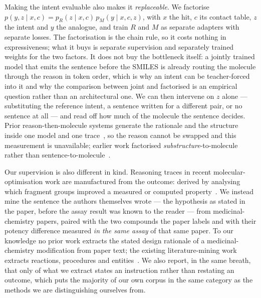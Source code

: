 Making the intent evaluable also makes it \emph{replaceable}. We factorise
$p(y,z\mid x,c)=p_R(z\mid x,c)\,p_M(y\mid x,c,z)$, with $x$ the hit, $c$ its contact table, $z$ the
intent and $y$ the analogue, and train $R$ and $M$ as separate adapters with separate losses. The
factorisation is the chain rule, so it costs nothing in expressiveness; what it buys is separate
supervision and separately trained weights for the two factors. It does not buy the bottleneck
itself: a jointly trained model that emits the sentence before the SMILES is already routing the
molecule through the reason in token order, which is why an intent can be teacher-forced into it and
why the comparison between joint and factorised is an empirical question rather than an
architectural one. We
can then intervene on $z$ alone --- substituting the reference intent, a sentence written for
a different pair, or no sentence at all --- and read off how much of the molecule the sentence
decides. Prior reason-then-molecule systems generate the rationale and the structure inside one
model and one trace~\citep{liu2026desron,liu2026drugr,wen2026logos}, so the reason cannot be swapped
and this measurement is unavailable; earlier work factorised \emph{substructure}-to-molecule rather
than sentence-to-molecule~\citep{jin2020rationale}.

Our supervision is also different in kind. Reasoning traces in recent molecular-optimisation work
are manufactured from the outcome: derived by analysing which fragment groups improved a measured
or computed property~\citep{liu2026desro,liu2026drugr}. We instead mine the sentence the authors
themselves wrote --- the hypothesis as stated in the paper, before the assay result was known to the
reader --- from  medicinal-chemistry papers, paired with the two compounds the paper
labels and with their potency difference measured \emph{in the same assay} of that same paper. To
our knowledge no prior work extracts the stated design rationale of a medicinal-chemistry
modification from paper text; the existing literature-mining work extracts reactions, procedures and
entities~\citep{chemminer2024,materials2025ie}. We also report, in the same breath, that only
 of what we extract states an instruction rather than restating an outcome, which puts the
majority of our own corpus in the same category as the methods we are distinguishing ourselves from.

